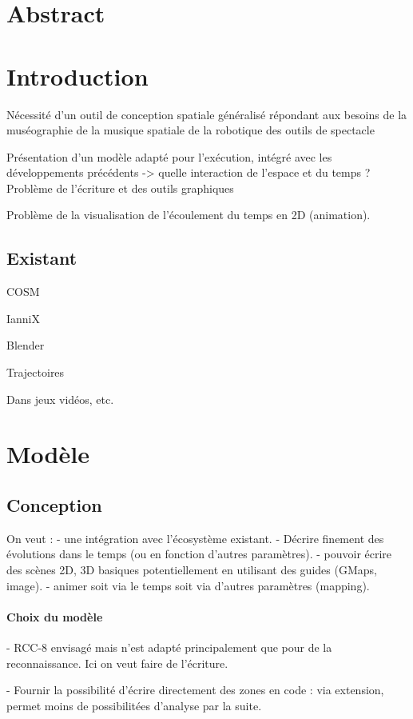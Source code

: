 \documentclass[french]{article}
\begin{document}
\section*{Abstract}
\section{Introduction}
Nécessité d'un outil de conception spatiale généralisé répondant aux besoins de la muséographie
de la musique spatiale
de la robotique
des outils de spectacle

Présentation d'un modèle adapté pour l'exécution, intégré avec les développements précédents
-> quelle interaction de l'espace et du temps ?
Problème de l'écriture et des outils graphiques

Problème de la visualisation de l'écoulement du temps en 2D (animation).

\subsection{Existant}

COSM

IanniX

Blender

Trajectoires

Dans jeux vidéos, etc.

\section{Modèle}
\subsection{Conception}
On veut : 
- une intégration avec l'écosystème existant.
- Décrire finement des évolutions dans le temps (ou en fonction d'autres paramètres).
- pouvoir écrire des scènes 2D, 3D basiques potentiellement en utilisant des guides (GMaps, image).
- animer soit via le temps soit via d'autres paramètres (mapping).

\paragraph{Choix du modèle}
- RCC-8 envisagé mais n'est adapté principalement que pour de la reconnaissance.
Ici on veut faire de l'écriture.

- Fournir la possibilité d'écrire directement des zones en code : 
via extension, permet moins de possibilitées d'analyse par la suite.
\end{document}

